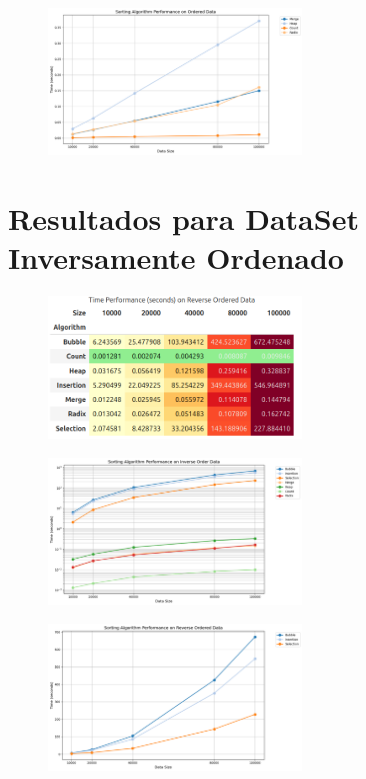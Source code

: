 \begin{figure}[H]
  \centering
  \includegraphics[width=0.6\textwidth]{images/o_order}
\end{figure}

\section{Resultados para DataSet Inversamente Ordenado}

\begin{figure}[H]
  \centering
  \includegraphics[width=0.6\textwidth]{images/invert_table}
\end{figure}

\begin{figure}[H]
  \centering
  \includegraphics[width=0.6\textwidth]{images/all_algo_inver}
\end{figure}

\begin{figure}[H]
  \centering
  \includegraphics[width=0.6\textwidth]{images/o2_inv}
\end{figure}

